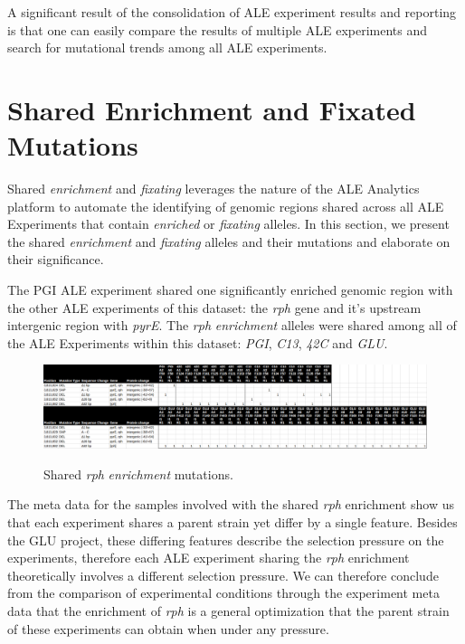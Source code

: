 \documentclass[12pt,final,masters,chapterheads]{ucsd}  %
\begin{document}
A significant result of the consolidation of ALE experiment results and reporting is that one can easily compare the results of multiple ALE experiments and search for mutational trends among all ALE experiments.

\section{Shared Enrichment and Fixated Mutations}

Shared \textit{enrichment} and \textit{fixating} leverages the nature of the ALE Analytics platform to automate the identifying of genomic regions shared across all ALE Experiments that contain \textit{enriched} or \textit{fixating} alleles. In this section, we present the shared \textit{enrichment} and \textit{fixating} alleles and their mutations and elaborate on their significance.

%
%

The PGI ALE experiment shared one significantly enriched genomic region with the other ALE experiments of this dataset: the \textit{rph} gene and it's upstream intergenic region with \textit{pyrE}. The \textit{rph} \textit{enrichment} alleles were shared among all of the ALE Experiments within this dataset: \textit{PGI}, \textit{C13}, \textit{42C} and \textit{GLU}. 

\begin{figure}[h!]
  \caption{Shared \textit{rph} \textit{enrichment} mutations.}
  \centering
  \includegraphics[width=\textwidth]{rph_pyrE_shared_enrich_mut.png}
  \label{fig:rph_pyrE_shared_enrich_mut}
\end{figure}

The meta data for the samples involved with the shared \textit{rph} enrichment show us that each experiment shares a parent strain yet differ by a single feature. Besides the GLU project, these differing features describe the selection pressure on the experiments, therefore each ALE experiment sharing the \textit{rph} enrichment theoretically involves a different selection pressure. We can therefore conclude from the comparison of experimental conditions through the experiment meta data that the enrichment of \textit{rph} is a general optimization that the parent strain of these experiments can obtain when under any pressure.
\end{document}

